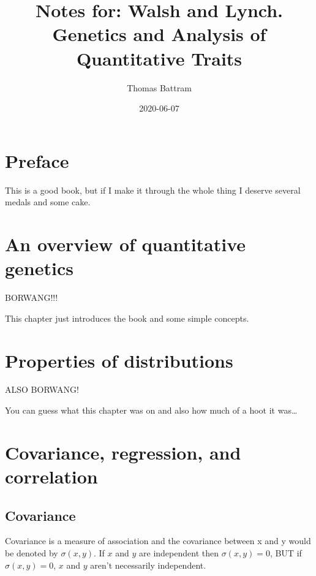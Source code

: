 \documentclass[
]{book}
\title{Notes for: Walsh and Lynch. Genetics and Analysis of Quantitative Traits}
\author{Thomas Battram}
\date{2020-06-07}
\begin{document}
\maketitle

{
\setcounter{tocdepth}{1}
\tableofcontents
}
\hypertarget{preface}{%
\chapter*{Preface}\label{preface}}

This is a good book, but if I make it through the whole thing I deserve several medals and some cake.

\hypertarget{an-overview-of-quantitative-genetics}{%
\chapter{An overview of quantitative genetics}\label{an-overview-of-quantitative-genetics}}

BORWANG!!!

This chapter just introduces the book and some simple concepts.

\hypertarget{properties-of-distributions}{%
\chapter{Properties of distributions}\label{properties-of-distributions}}

ALSO BORWANG!

You can guess what this chapter was on and also how much of a hoot it was\ldots{}

\hypertarget{covariance-regression-and-correlation}{%
\chapter{Covariance, regression, and correlation}\label{covariance-regression-and-correlation}}

\hypertarget{covariance}{%
\section{Covariance}\label{covariance}}

Covariance is a measure of association and the covariance between x and y would be denoted by \(\sigma(x, y)\). If \(x\) and \(y\) are independent then \(\sigma(x, y) = 0\), BUT if \(\sigma(x, y) = 0\), \(x\) and \(y\) aren't necessarily independent.
\end{document}
